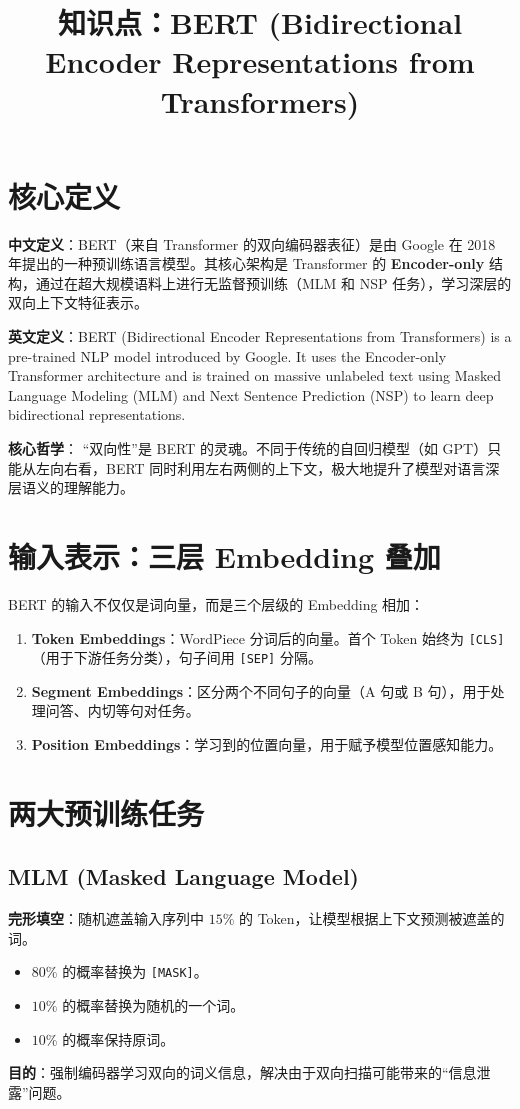 \documentclass[12pt, a4paper]{article}
\title{知识点：BERT (Bidirectional Encoder Representations from Transformers)}
\author{}
\date{}
\begin{document}
\maketitle

\section{核心定义}
\textbf{中文定义}：BERT（来自 Transformer 的双向编码器表征）是由 Google 在 2018 年提出的一种预训练语言模型。其核心架构是 Transformer 的 \textbf{Encoder-only} 结构，通过在超大规模语料上进行无监督预训练（MLM 和 NSP 任务），学习深层的双向上下文特征表示。

\textbf{英文定义}：BERT (Bidirectional Encoder Representations from Transformers) is a pre-trained NLP model introduced by Google. It uses the Encoder-only Transformer architecture and is trained on massive unlabeled text using Masked Language Modeling (MLM) and Next Sentence Prediction (NSP) to learn deep bidirectional representations.

\textbf{核心哲学}：
“双向性”是 BERT 的灵魂。不同于传统的自回归模型（如 GPT）只能从左向右看，BERT 同时利用左右两侧的上下文，极大地提升了模型对语言深层语义的理解能力。

\section{输入表示：三层 Embedding 叠加}
BERT 的输入不仅仅是词向量，而是三个层级的 Embedding 相加：
\begin{enumerate}
    \item \textbf{Token Embeddings}：WordPiece 分词后的向量。首个 Token 始终为 \texttt{[CLS]}（用于下游任务分类），句子间用 \texttt{[SEP]} 分隔。
    \item \textbf{Segment Embeddings}：区分两个不同句子的向量（A 句或 B 句），用于处理问答、内切等句对任务。
    \item \textbf{Position Embeddings}：学习到的位置向量，用于赋予模型位置感知能力。
\end{enumerate}

\section{两大预训练任务}

\subsection{MLM (Masked Language Model)}
\textbf{完形填空}：随机遮盖输入序列中 $15\%$ 的 Token，让模型根据上下文预测被遮盖的词。
\begin{itemize}
    \item $80\%$ 的概率替换为 \texttt{[MASK]}。
    \item $10\%$ 的概率替换为随机的一个词。
    \item $10\%$ 的概率保持原词。
\end{itemize}
\textbf{目的}：强制编码器学习双向的词义信息，解决由于双向扫描可能带来的“信息泄露”问题。
\end{document}
